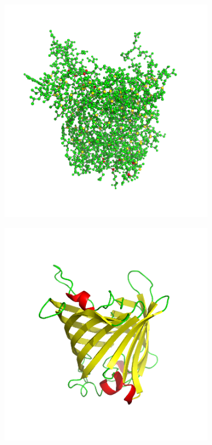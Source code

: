 \begin{figure}
  \begin{subfigure}{.5\textwidth}
  \centering
  {\includegraphics[width=0.9\linewidth]{./figures/ch1/ball_sticks_representation}}
    \label{Fig:ball_sticks_representation}
  \caption{}
  \end{subfigure}%
  \begin{subfigure}{.5\textwidth}
  \centering
  {\includegraphics[width=0.9\linewidth]{./figures/ch1/cartoon_representation}}    

\end{subfigure}
\end{figure}
